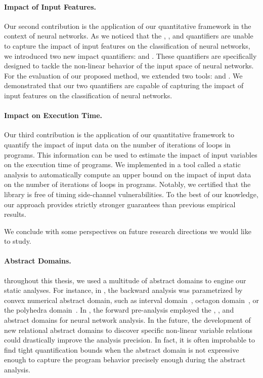\paragraph{Impact of Input Features.} Our second contribution is the application of our quantitative framework in the context of neural networks.
As we noticed that the \outcomesname{}, \rangename{}, and \qusedname{} quantifiers are unable to capture the impact of input features on the classification of neural networks, we introduced two new impact quantifiers: \changesname{} and \qlibraname{}.
These quantifiers are specifically designed to tackle the non-linear behavior of the input space of neural networks.
For the evaluation of our proposed method, we extended two tools: \impatto{} and \libra{}.\sidenote{\libraurl}
We demonstrated that our two quantifiers are capable of capturing the impact of input features on the classification of neural networks.

\paragraph{Impact on Execution Time.} Our third contribution is the application of our quantitative framework to quantify the impact of input data on the number of iterations of loops in programs. This information can be used to estimate the impact of input variables on the execution time of programs.
We implemented in a tool called \timesec\sidenote{\timesecurl} a static analysis to automatically compute an upper bound on the impact of input data on the number of iterations of loops in programs.
Notably, we certified that the \bignum{} library\sidenote{\bignumurl} is free of timing side-channel vulnerabilities.
To the best of our knowledge, our approach provides strictly stronger guarantees than previous empirical results.


\frenchdiv

We conclude with some perspectives on future research directions we would like to study.

\paragraph{Abstract Domains.}

throughout this thesis, we used a multitude of abstract domains to engine our static analyses. For instance, in , the backward analysis was parametrized by convex numerical abstract domain, such as interval domain~, octagon domain~, or the polyhedra domain~\cite{Cousot1978}. In , the forward pre-analysis employed the \symbolic{} \cite{Wang2018b}, \deeppoly{} \cite{Singh2019}, and \neurify{} \cite{Wang2018a} abstract domains for neural network analysis. In the future, the development of new relational abstract domains to discover specific non-linear variable relations could drastically improve the analysis precision.
In fact, it is often improbable to find tight quantification bounds when the abstract domain is not expressive enough to capture the program behavior precisely enough during the abstract analysis.

